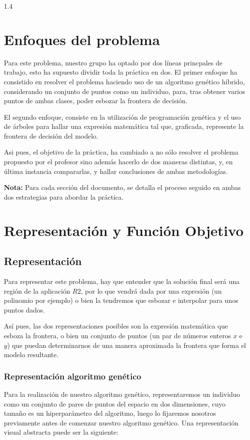\documentclass{article}
\begin{document}
\begin{spacing}{1.4}
\section{Enfoques del problema}
Para este problema, nuestro grupo ha optado por dos líneas princpales de trabajo,
esto ha supuesto dividir toda la práctica en dos. El primer enfoque ha consistido en resolver
el problema haciendo uso de un algoritmo genético híbrido, considerando un conjunto de puntos
como un individuo, para, tras obtener varios puntos de ambas clases, poder esbozar la frontera
de decisión.

El segundo enfoque, consiste en la utilización de programación genética y el uso de árboles
para hallar una expresión matemática tal que, graficada, represente la frontera de decisión del modelo.

Asi pues, el objetivo de la práctica, ha cambiado a no sólo resolver el problema propuesto por el profesor
sino además hacerlo de dos maneras distintas, y, en última instancia compararlas, y hallar conclusiones
de ambas metodologías.

\textbf{Nota:} Para cada sección del documento, se detalla el proceso seguido en ambas dos
estrategias para abordar la práctica.


\section{Representación y Función Objetivo}
\subsection{Representación}
Para representar este problema, hay que entender que la solución final será una región de la aplicación $R2$,
por lo que vendrá dada por una expresión (un polinomio por ejemplo) o bien la tendremos que esbozar e interpolar
para unos puntos dados.

Así pues, las dos representaciones posibles son la expresión matemática que esboza la frontera, o bien un conjunto
de puntos (un par de números enteros $x$ e $y$) que puedan determinarnos de una manera aproximada la frontera que forma
el modelo resultante.

\subsubsection{Representación algoritmo genético}

Para la realización de nuestro algoritmo genético, representaremos un individuo como un conjunto de pares de puntos del espacio en dos dimensiones, 
cuyo tamaño es un hiperparámetro del algoritmo, luego lo fijaremos nosotros previamente antes de comenzar nuestro algoritmo genético.
Una representación visual abstracta puede ser la siguiente:


\end{spacing}
\end{document}
